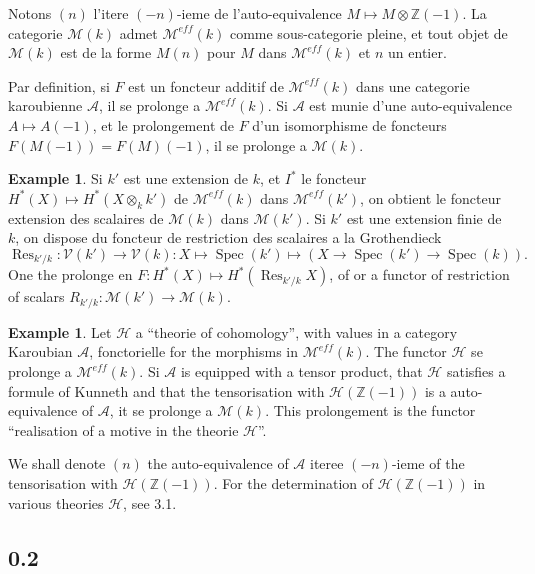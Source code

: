 \documentclass[12pt,a4paper]{article}
\theoremstyle{plain}
\theoremstyle{definition}
\newtheorem{example}[definition]{Example}
\theoremstyle{remark}
\DeclareMathOperator{\Spec}{Spec}
\DeclareMathOperator{\Res}{Res}
\newcommand{\Z}{\mathbb{Z}}
\begin{document}
Notons $(n)$ l'itere $(-n)$-ieme de l'auto-equivalence $M \mapsto M \otimes \Z(-1)$. La categorie
$\mathcal{M}(k)$ admet $\mathcal{M}^{eff}(k)$ comme sous-categorie pleine, et tout objet de $\mathcal{M}(k)$ est
de la forme $M(n)$ pour $M$ dans $\mathcal{M}^{eff}(k)$ et $n$ un entier.

Par definition, si $F$ est un foncteur additif de $\mathcal{M}^{eff}(k)$ dans une categorie karoubienne
$\mathcal{A}$, il se prolonge a $\mathcal{M}^{eff}(k)$. Si $\mathcal{A}$ est munie d'une auto-equivalence $A \mapsto A(-1)$,
et le prolongement de $F$ d'un isomorphisme de foncteurs $F(M(-1)) = F(M)(-1)$,
il se prolonge a $\mathcal{M}(k)$.

\begin{example}
Si $k'$ est une extension de $k$, et $I^*$ le foncteur $H^*(X) \mapsto H^*(X \otimes_k k')$
de $\mathcal{M}^{eff}(k)$ dans $\mathcal{M}^{eff}(k')$, on obtient le foncteur extension des scalaires de
$\mathcal{M}(k)$ dans $\mathcal{M}(k')$. Si $k'$ est une extension finie de $k$, on dispose du foncteur de
restriction des scalaires a la Grothendieck
\[
\Res_{k'/k}: \mathcal{V}(k') \to \mathcal{V}(k): X \mapsto \Spec(k') \mapsto (X \to \Spec(k') \to \Spec(k)).
\]
One the prolonge en $F: H^*(X) \mapsto H^*(\Res_{k'/k} X)$, of or a functor of restriction of scalars $R_{k'/k}: \mathcal{M}(k') \to \mathcal{M}(k)$.
\end{example}

\begin{example}
Let $\mathcal{H}$ a ``theorie of cohomology'', with values in a category Karoubian
$\mathcal{A}$, fonctorielle for the morphisms in $\mathcal{M}^{eff}(k)$. The functor $\mathcal{H}$ se prolonge
a $\mathcal{M}^{eff}(k)$. Si $\mathcal{A}$ is equipped with a tensor product, that $\mathcal{H}$ satisfies a formule of
Kunneth and that the tensorisation with $\mathcal{H}(\Z(-1))$ is a auto-equivalence of $\mathcal{A}$,
it se prolonge a $\mathcal{M}(k)$. This prolongement is the functor ``realisation of a motive
in the theorie $\mathcal{H}$''.

We shall denote $(n)$ the auto-equivalence of $\mathcal{A}$ iteree $(-n)$-ieme of the tensorisation
with $\mathcal{H}(\Z(-1))$. For the determination of $\mathcal{H}(\Z(-1))$ in various theories $\mathcal{H}$,
see 3.1.
\end{example}

\subsection*{0.2}
\end{document}
